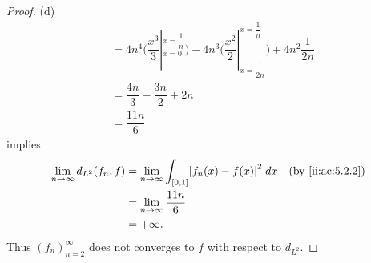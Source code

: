 \begin{proof}{(d)}
\begin{align*}
     & = 4n^4 \bigg(\dfrac{x^3}{3}|_{x = 0}^{x = \dfrac{1}{n}}\bigg) - 4n^3 \bigg(\dfrac{x^2}{2}|_{x = \dfrac{1}{2n}}^{x = \dfrac{1}{n}}\bigg) + 4n^2 \dfrac{1}{2n} \\
     & = \dfrac{4n}{3} - \dfrac{3n}{2} + 2n                                                                                                                         \\
     & = \dfrac{11n}{6}
  \end{align*}
  implies
  \begin{align*}
    \lim_{n \to \infty} d_{L^2}(f_n, f) & = \lim_{n \to \infty} \int_{[0, 1]} \abs{f_n(x) - f(x)}^2 \; dx &  & \by{ii:ac:5.2.2} \\
                                        & = \lim_{n \to \infty} \dfrac{11n}{6}                                                  \\
                                        & = +\infty.
  \end{align*}
  Thus \((f_n)_{n = 2}^\infty\) does not converges to \(f\) with respect to \(d_{L^2}\).
\end{proof}
